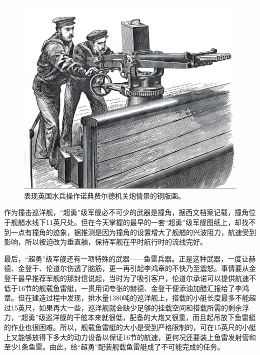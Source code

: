 \documentclass[12pt,UTF8]{ctexbook}
\begin{document}
\begin{figure}[htbp]
	\centering
	\includegraphics[width=1\linewidth]{Images/28}
	\caption{表现英国水兵操作诺典费尔德机关炮情景的铜版画。}
	\label{fig:1}
\end{figure}

作为撞击巡洋舰，“超勇”级军舰必不可少的武器是撞角，据西文档案记载，撞角位于舰艏水线下11英尺处。但在今天掌握的最早的一套“超勇”级军舰图纸上，却找不到一点有撞角的迹象，据推测是因为撞角的设置增大了舰艏的兴波阻力，航速受到影响，所以被迫改为垂直艏，保持军舰在平时航行时的流线完好。

最后，“超勇”级军舰还有一项特殊的武器——鱼雷兵器。正是这种武器，一度让赫德、金登干、伦道尔伤透了脑筋，更一再引起李鸿章的不快乃至震怒。事情要从金登干最早推荐军舰的那封信说起，当时为了吸引客户，伦道尔承诺可以提供航速不低于16节的舰载鱼雷艇，一贯用词夸张的赫德、金登干便添油加醋汇报给了李鸿章。但在建造过程中发现，排水量1380吨的巡洋舰上，搭载的小艇长度最多不能超过15英尺，如果再大一些，巡洋舰就会缺少足够的挂载空间和搭载所需的剩余浮力，“超勇”级巡洋舰的干舷本来就很低，配备的大炮又很重，而且起吊放下鱼雷艇的作业也很困难。所以，舰载鱼雷艇的大小是受到严格限制的，可在15英尺的小艇上又能够放得下多大的动力设备以保证16节的航速，更何况还要装上鱼雷发射管和至少1条鱼雷。由此，给“超勇”配装舰载鱼雷艇成了不可能完成的任务。
\end{document}
